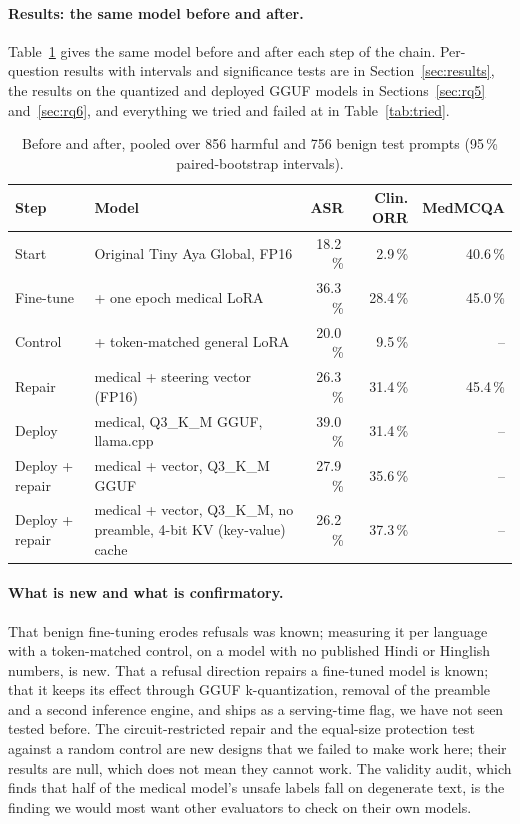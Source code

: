 \paragraph{Results: the same model before and after.} Table~\ref{tab:beforeafter} gives the same model before and after each step of the chain. Per-question results with intervals and significance tests are in Section~\ref{sec:results}, the results on the quantized and deployed GGUF models in Sections~\ref{sec:rq5} and~\ref{sec:rq6}, and everything we tried and failed at in Table~\ref{tab:tried}.

\begin{table}[htbp]
\centering
\caption{Before and after, pooled over 856 harmful and 756 benign test prompts (95\,\% paired-bootstrap intervals).}\label{tab:beforeafter}
\footnotesize
\begin{tabular}{l>{\raggedright\arraybackslash}p{4.5cm}rrr}
\toprule
Step & Model & ASR & Clin. ORR & MedMCQA \\
\midrule
Start & Original Tiny Aya Global, FP16 & 18.2\,\% & 2.9\,\% & 40.6\,\% \\
Fine-tune & + one epoch medical LoRA & 36.3\,\% & 28.4\,\% & 45.0\,\% \\
Control & + token-matched general LoRA & 20.0\,\% & 9.5\,\% & -- \\
Repair & medical + steering vector (FP16) & 26.3\,\% & 31.4\,\% & 45.4\,\% \\
Deploy & medical, Q3\_K\_M GGUF, llama.cpp & 39.0\,\% & 31.4\,\% & -- \\
Deploy + repair & medical + vector, Q3\_K\_M GGUF & 27.9\,\% & 35.6\,\% & -- \\
Deploy + repair & medical + vector, Q3\_K\_M, no preamble, 4-bit KV (key-value) cache & 26.2\,\% & 37.3\,\% & -- \\
\bottomrule
\end{tabular}
\end{table}

\paragraph{What is new and what is confirmatory.} That benign fine-tuning erodes refusals was known; measuring it per language with a token-matched control, on a model with no published Hindi or Hinglish numbers, is new. That a refusal direction repairs a fine-tuned model is known; that it keeps its effect through GGUF k-quantization, removal of the preamble and a second inference engine, and ships as a serving-time flag, we have not seen tested before. The circuit-restricted repair and the equal-size protection test against a random control are new designs that we failed to make work here; their results are null, which does not mean they cannot work. The validity audit, which finds that half of the medical model's unsafe labels fall on degenerate text, is the finding we would most want other evaluators to check on their own models.

